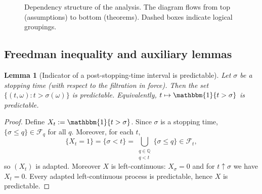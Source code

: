 \documentclass{statsoc}
\newtheorem{lemma}[lemma]{Lemma}
\newcommand{\1}{\mathbbm{1}}
\begin{document}
\begin{figure}[!hp]
{
}
\caption{Dependency structure of the analysis. The diagram flows from top (assumptions) to bottom (theorems). Dashed boxes indicate logical groupings.}
\label{fig:assDAG}
\end{figure}
\break

\subsection{Freedman inequality and auxiliary lemmas}\label{sec:freedman}

\begin{lemma}[Indicator of a post-stopping-time interval is predictable]\label{lem:predictable-stoptime}
Let $\sigma$ be a stopping time (with respect to the filtration in force). Then the set $\{(t,\omega):t>\sigma(\omega)\}$ is predictable. Equivalently, $t\mapsto \1\{t>\sigma\}$ is predictable.
\end{lemma}

\begin{proof}
Define $X_t:=\1\{t>\sigma\}$. Since $\sigma$ is a stopping time, $\{\sigma\le q\}\in\mathcal F_q$ for all $q$.
Moreover, for each $t$,
\[
\{X_t=1\}=\{\sigma<t\}=\bigcup_{\substack{q\in\mathbb Q\\ q<t}}\{\sigma\le q\}\in\mathcal F_t,
\]
so $(X_t)$ is adapted. Moreover $X$ is left-continuous: $X_\sigma=0$ and for $t\uparrow\sigma$ we have $X_t=0$. Every adapted left-continuous process is predictable, hence $X$ is predictable.
\end{proof}
\end{document}

